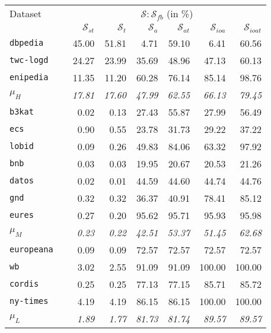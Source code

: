 %
\begin{tabular}{lc@{\hs}rrrrrr}
\toprule
Dataset & \phantom{a} & \multicolumn{6}{c}{$\mathcal{S}:\mathcal{S}_{fb}$ (in \%)} \\
\cmidrule{3-8}
 & \phantom{a} & $\mathcal{S}_{st}$ & $\mathcal{S}_{t}$ & $\mathcal{S}_{a}$ & $\mathcal{S}_{at}$ & $\mathcal{S}_{ioa}$ & $\mathcal{S}_{ioat}$ \\
\texttt{dbpedia} & \phantom{a} & 45.00 & 51.81 & 4.71 & 59.10 & 6.41 & 60.56 \\
\midrule
\texttt{twc-logd} & \phantom{a} & 24.27 & 23.99 & 35.69 & 48.96 & 47.13 & 60.13 \\
\texttt{enipedia} & \phantom{a} & 11.35 & 11.20 & 60.28 & 76.14 & 85.14 & 98.76 \\
$\mu_H$ & \phantom{a} & \emph{17.81} & \emph{17.60} & \emph{47.99} & \emph{62.55} & \emph{66.13} & \emph{79.45} \\
\midrule
\texttt{b3kat} & \phantom{a} & 0.02 & 0.13 & 27.43 & 55.87 & 27.99 & 56.49 \\
\texttt{ecs} & \phantom{a} & 0.90 & 0.55 & 23.78 & 31.73 & 29.22 & 37.22 \\
\texttt{lobid} & \phantom{a} & 0.09 & 0.26 & 49.83 & 84.06 & 63.32 & 97.92 \\
\texttt{bnb} & \phantom{a} & 0.03 & 0.03 & 19.95 & 20.67 & 20.53 & 21.26 \\
\texttt{datos} & \phantom{a} & 0.02 & 0.01 & 44.59 & 44.60 & 44.74 & 44.76 \\
\texttt{gnd} & \phantom{a} & 0.32 & 0.32 & 36.37 & 40.91 & 78.41 & 85.12 \\
\texttt{eures} & \phantom{a} & 0.27 & 0.20 & 95.62 & 95.71 & 95.93 & 95.98 \\
$\mu_M$ & \phantom{a} & \emph{0.23} & \emph{0.22} & \emph{42.51} & \emph{53.37} & \emph{51.45} & \emph{62.68} \\
\midrule
\texttt{europeana} & \phantom{a} & 0.09 & 0.09 & 72.57 & 72.57 & 72.57 & 72.57 \\
\texttt{wb} & \phantom{a} & 3.02 & 2.55 & 91.09 & 91.09 & 100.00 & 100.00 \\
\texttt{cordis} & \phantom{a} & 0.25 & 0.25 & 77.13 & 77.15 & 85.71 & 85.72 \\
\texttt{ny-times} & \phantom{a} & 4.19 & 4.19 & 86.15 & 86.15 & 100.00 & 100.00 \\
$\mu_L$ & \phantom{a} & \emph{1.89} & \emph{1.77} & \emph{81.73} & \emph{81.74} & \emph{89.57} & \emph{89.57} \\
\bottomrule
\end{tabular}%
%